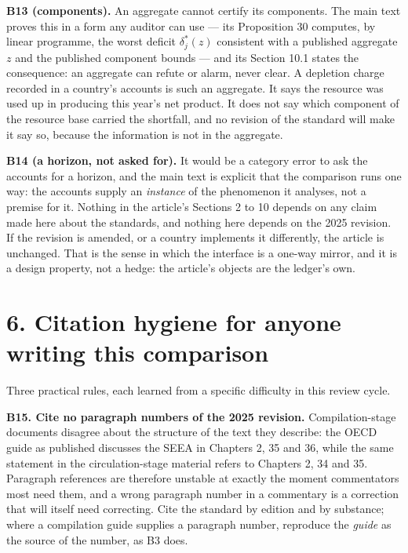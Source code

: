 \documentclass[11pt]{article}
\begin{document}
\textbf{B13 (components).} An aggregate cannot certify its components. The main text proves this in a form any auditor can use --- its Proposition 30 computes, by linear programme, the worst deficit \(\delta_j^{\ast}(z)\) consistent with a published aggregate \(z\) and the published component bounds --- and its Section 10.1 states the consequence: an aggregate can refute or alarm, never clear. A depletion charge recorded in a country's accounts is such an aggregate. It says the resource was used up in producing this year's net product. It does not say which component of the resource base carried the shortfall, and no revision of the standard will make it say so, because the information is not in the aggregate.

\textbf{B14 (a horizon, not asked for).} It would be a category error to ask the accounts for a horizon, and the main text is explicit that the comparison runs one way: the accounts supply an \emph{instance} of the phenomenon it analyses, not a premise for it. Nothing in the article's Sections 2 to 10 depends on any claim made here about the standards, and nothing here depends on the 2025 revision. If the revision is amended, or a country implements it differently, the article is unchanged. That is the sense in which the interface is a one-way mirror, and it is a design property, not a hedge: the article's objects are the ledger's own.

\vspace{0.8em}

\section*{6. Citation hygiene for anyone writing this comparison}\label{6-citation-hygiene-for-anyone-writing-this-comparison}

Three practical rules, each learned from a specific difficulty in this review cycle.

\textbf{B15. Cite no paragraph numbers of the 2025 revision.} Compilation-stage documents disagree about the structure of the text they describe: the OECD guide as published discusses the SEEA in Chapters 2, 35 and 36, while the same statement in the circulation-stage material refers to Chapters 2, 34 and 35. Paragraph references are therefore unstable at exactly the moment commentators most need them, and a wrong paragraph number in a commentary is a correction that will itself need correcting. Cite the standard by edition and by substance; where a compilation guide supplies a paragraph number, reproduce the \emph{guide} as the source of the number, as B3 does.
\end{document}
